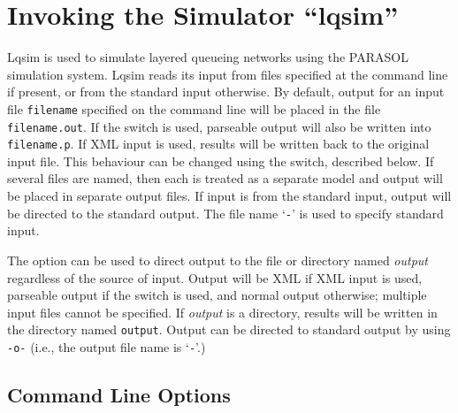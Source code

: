 
\chapter{Invoking the Simulator ``lqsim''}
\label{sec:invoking-lqsim}

Lqsim is used to simulate layered queueing networks using the
PARASOL~\cite{perf:neilson-91b} simulation system.
Lqsim reads its input from files specified at the command line if
present, or from the standard input otherwise.  By default, output for
an input file \texttt{filename} specified on the command line will be
placed in the file \texttt{filename.out}.  If the  switch is
used, parseable output will also be written
into \texttt{filename.p}. If XML input is used,
results will be written back to the original input file.  This
behaviour can be changed using the  switch, described
below.  If several files are named, then each is treated as a separate
model and output will be placed in separate output files.  If input is
from the standard input, output will be directed to the standard
output.  The file name `\texttt{-}' is used to specify standard input.

The  option can be used to direct output to the file or directory named \emph{output}
regardless of the source of input.  Output will be XML if XML
input is used, parseable output if the  switch is used, and normal output
otherwise; multiple input files cannot be specified.  If \emph{output} is a directory, results will be
written in the directory named \texttt{output}.  Output can be directed to standard output by using
\texttt{-o-} (i.e., the output file name is `\texttt{-}'.)

\section{Command Line Options}
\label{sec:lqsim-options}

